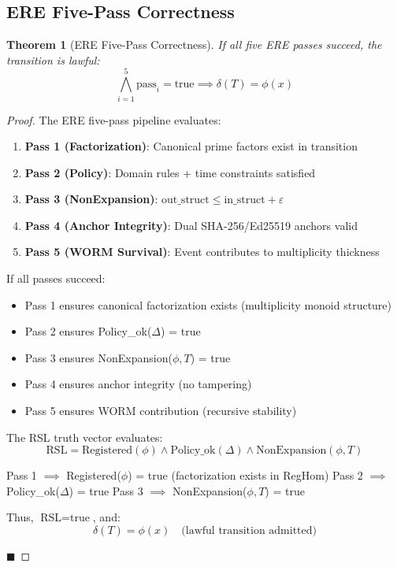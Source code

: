 \documentclass[11pt,a4paper]{article}
\newtheorem{theorem}{Theorem}[section]
\begin{document}
\subsection{ERE Five-Pass Correctness}

\begin{theorem}[ERE Five-Pass Correctness]\label{thm:ere_correctness}
If all five ERE passes succeed, the transition is lawful:
$$\bigwedge_{i=1}^5 \text{pass}_i = \text{true} \implies \delta(T) = \phi(x)$$
\end{theorem}

\begin{proof}
The ERE five-pass pipeline evaluates:
\begin{enumerate}
    \item \textbf{Pass 1 (Factorization)}: Canonical prime factors exist in transition
    \item \textbf{Pass 2 (Policy)}: Domain rules + time constraints satisfied
    \item \textbf{Pass 3 (NonExpansion)}: $\text{out\_struct} \leq \text{in\_struct} + \varepsilon$
    \item \textbf{Pass 4 (Anchor Integrity)}: Dual SHA-256/Ed25519 anchors valid
    \item \textbf{Pass 5 (WORM Survival)}: Event contributes to multiplicity thickness
\end{enumerate}

If all passes succeed:
\begin{itemize}
    \item Pass 1 ensures canonical factorization exists (multiplicity monoid structure)
    \item Pass 2 ensures Policy\_ok($\Delta$) = true
    \item Pass 3 ensures NonExpansion($\phi, T$) = true
    \item Pass 4 ensures anchor integrity (no tampering)
    \item Pass 5 ensures WORM contribution (recursive stability)
\end{itemize}

The RSL truth vector evaluates:
$$\text{RSL} = \text{Registered}(\phi) \land \text{Policy\_ok}(\Delta) \land \text{NonExpansion}(\phi, T)$$

Pass 1 $\implies$ Registered($\phi$) = true (factorization exists in RegHom)
Pass 2 $\implies$ Policy\_ok($\Delta$) = true
Pass 3 $\implies$ NonExpansion($\phi, T$) = true

Thus, $\text{RSL} = \text{true}$, and:
$$\delta(T) = \phi(x) \quad \text{(lawful transition admitted)}$$

\hfill $\blacksquare$
\end{proof}
\end{document}
